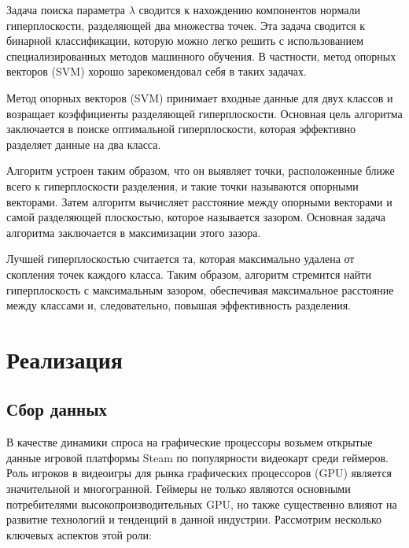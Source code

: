 \documentclass[14pt, a4paper]{extarticle}
\begin{document}
Задача поиска параметра \( \lambda \) сводится к нахождению компонентов нормали гиперплоскости, разделяющей два множества точек. Эта задача сводится к бинарной классификации, которую можно легко решить с использованием специализированных методов машинного обучения. В частности, метод опорных векторов (SVM) хорошо зарекомендовал себя в таких задачах.

Метод опорных векторов (SVM) принимает входные данные для двух классов и возращает коэффициенты разделяющей гиперплоскости. Основная цель алгоритма заключается в поиске оптимальной гиперплоскости, которая эффективно разделяет данные на два класса.

Алгоритм устроен таким образом, что он выявляет точки, расположенные ближе всего к гиперплоскости разделения, и такие точки называются опорными векторами. Затем алгоритм вычисляет расстояние между опорными векторами и самой разделяющей плоскостью, которое называется зазором. Основная задача алгоритма заключается в максимизации этого зазора.

Лучшей гиперплоскостью считается та, которая максимально удалена от скопления точек каждого класса. Таким образом, алгоритм стремится найти гиперплоскость с максимальным зазором, обеспечивая максимальное расстояние между классами и, следовательно, повышая эффективность разделения.


  \section{Реализация}
  \subsection{Сбор данных}
  В качестве динамики спроса на графические процессоры возьмем открытые данные игровой платформы Steam по популярности видеокарт среди геймеров.
  Роль игроков в видеоигры для рынка графических процессоров (GPU) является значительной и многогранной. Геймеры не только являются основными потребителями высокопроизводительных GPU, но также существенно влияют на развитие технологий и тенденций в данной индустрии. Рассмотрим несколько ключевых аспектов этой роли:
\end{document}
